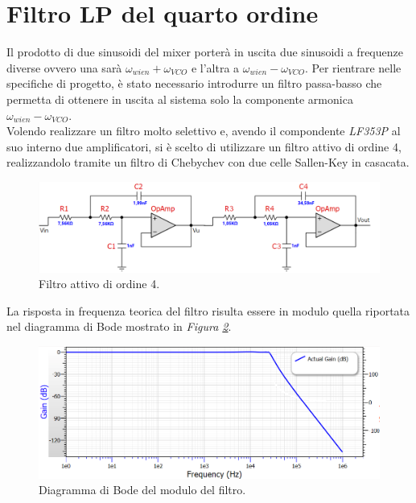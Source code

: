 \documentclass[titlepage]{report}
\begin{document}
\section{Filtro LP del quarto ordine}
	Il prodotto di due sinusoidi del mixer porterà in uscita due sinusoidi a frequenze diverse ovvero una sarà $\omega_{wien} + \omega_{VCO}$ e l'altra a $\omega_{wien} - \omega_{VCO}$. Per rientrare nelle specifiche di progetto, è stato necessario introdurre un filtro passa-basso che permetta di ottenere in uscita al sistema solo la componente armonica $\omega_{wien} - \omega_{VCO}$.
	\\ 
	Volendo realizzare un filtro molto selettivo e, avendo il compondente \textit{LF353P} al suo interno due amplificatori, si è scelto di utilizzare un filtro attivo di ordine 4, realizzandolo tramite un filtro di Chebychev con due celle Sallen-Key in casacata. 
	
	\begin{figure}[H]
		\centering
		\includegraphics[scale=0.9]{Immagini/sch_lp4.png}
		\caption{Filtro attivo di ordine 4.}
		\label{fig:LP4}
	\end{figure}	
	
	\noindent La risposta in frequenza teorica del filtro risulta essere in modulo quella riportata nel diagramma di Bode mostrato in \textit{Figura \ref{fig:BodeLp4}}.
	
	\begin{figure}[H]
		\centering
		\includegraphics[scale=0.9]{Immagini/bode_teorico_lp4.png}
		\caption{Diagramma di Bode del modulo del filtro.}
		\label{fig:BodeLp4}
	\end{figure}
\end{document}
